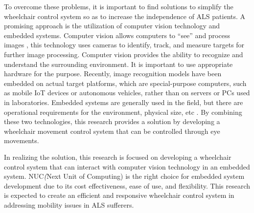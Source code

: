 To overcome these problems, it is important to find solutions to simplify the wheelchair control system so as to increase the independence of ALS patients. A promising approach is the utilization of computer vision technology and embedded systems. Computer vision allows computers to “see” and process images \cite{TIAN20201}, this technology uses cameras to identify, track, and measure targets for further image processing. Computer vision provides the ability to recognize and understand the surrounding environment. It is important to use appropriate hardware for the purpose. Recently, image recognition models have been embedded on actual target platforms, which are special-purpose computers, such as mobile IoT devices or autonomous vehicles, rather than on servers or PCs used in laboratories. Embedded systems are generally used in the field, but there are operational requirements for the environment, physical size, etc \cite{8939843}. By combining these two technologies, this research provides a solution by developing a wheelchair movement control system that can be controlled through eye movements.

In realizing the solution, this research is focused on developing a wheelchair control system that can interact with computer vision technology in an embedded system. NUC\textit(Next Unit of Computing) is the right choice for embedded system development due to its cost effectiveness, ease of use, and flexibility. This research is expected to create an efficient and responsive wheelchair control system in addressing mobility issues in ALS sufferers.